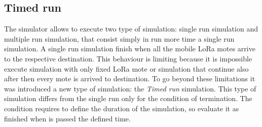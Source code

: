 \subsection{Timed run}
The simulator allows to execute two type of simulation: single run simulation and multiple run simulation, that consist simply in run more time a single run simulation. 
A single run simulation finish when all the mobile LoRa motes arrive to the respective destination. 
This behaviour is limiting because it is impossible execute simulation with only fixed LoRa mote or simulation that continue also after then every mote is arrived to destination. 
To go beyond these limitations it was introduced a new type of simulation: the \textit{Timed run} simulation. 
This type of simulation differs from the single run only for the condition of termination. 
The condition requires to define the duration of the simulation, so evaluate it as finished when is passed the defined time.

